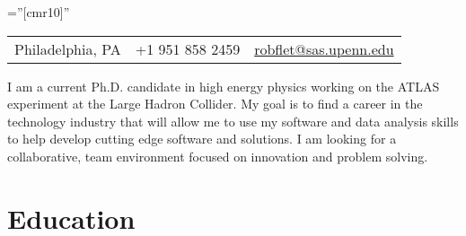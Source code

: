 \documentclass[a4paper,10pt]{article} %
\begin{document}
\pagestyle{empty} %

\font\fb=''[cmr10]'' %


\par{\bigskip\par} %
\begin{centering}
\begin{tabular}{ l | c | r}
Philadelphia, PA   &  +1 951 858 2459   &   \href{mailto:robflet@sas.upenn.edu}{robflet@sas.upenn.edu}
\end{tabular} \par
\end{centering}

\vspace{5mm}
I am a current Ph.D. candidate in high energy physics working on the ATLAS experiment at the Large Hadron
Collider. My goal is to find a career in the technology industry that will allow me to use my software
and data analysis skills to help develop cutting edge software and solutions. I am looking for a collaborative,
team environment focused on innovation and problem solving.
\vspace{3mm}






\section{Education}
\end{document}

